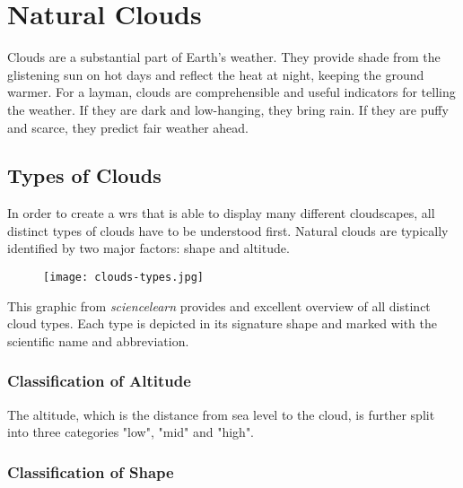 \section{Natural Clouds}
Clouds are a substantial part of Earth's weather. They provide shade from the glistening sun on hot days and reflect the heat at night, keeping the ground warmer.
For a layman, clouds are comprehensible and useful indicators for telling the weather. If they are dark and low-hanging, they bring rain. If they are puffy and scarce, they predict fair weather ahead.

\subsection{Types of Clouds}
In order to create a \gls{wrs} that is able to display many different cloudscapes, all distinct types of clouds have to be understood first.
Natural clouds are typically identified by two major factors: shape and \gls{altitude}.

\begin{figure}[H]
    \texttt{[image: clouds-types.jpg]}
    \label{img:ui:mockup:live}
\end{figure}

\noindent
This graphic from \emph{sciencelearn} provides and excellent overview of all distinct cloud types.
Each type is depicted in its signature shape and marked with the scientific name and abbreviation.



\subsubsection{Classification of Altitude}
The \gls{altitude}, which is the distance from sea level to the cloud, is further split into three categories "low", "mid" and "high". 

\subsubsection{Classification of Shape}